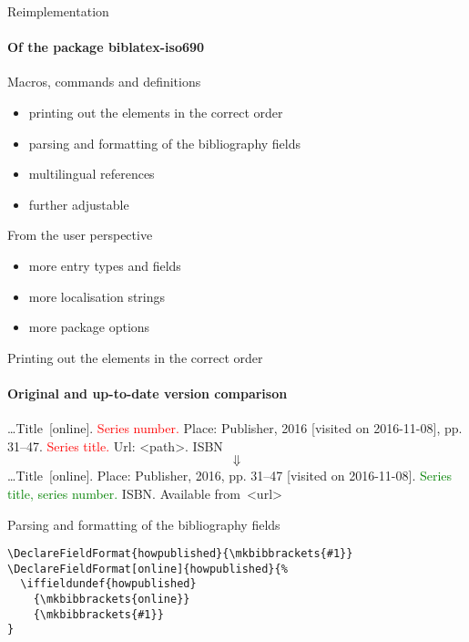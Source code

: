 \documentclass{beamer}
\begin{document}
\begin{frame}{Reimplementation}
\framesubtitle{Of the package \textsf{biblatex-iso690}}
Macros, commands and definitions
\begin{itemize}
\item printing out the elements in the correct order
\item parsing and formatting of the bibliography fields
\item multilingual references
\item further adjustable
\end{itemize}

From the user perspective
\begin{itemize}
\item more entry types and fields
\item more localisation strings
\item more package options
\end{itemize}
\end{frame}

\begin{frame}{Printing out the elements in the correct order}
\framesubtitle{Original and up-to-date version comparison}
\dots Title~[online]. \textcolor{Red}{Series number.}
      Place: Publisher, 2016 [visited on 2016-11-08], pp. 31--47.
      \textcolor{Red}{Series title.} Url: <path>. ISBN
\[
\Downarrow
\]
\dots Title~[online]. Place: Publisher, 2016, pp. 31--47
      [visited on 2016-11-08]. \textcolor{Green}{Series title,
      series number.} ISBN. Available from~<url>
\end{frame}

\begin{frame}[fragile]{Parsing and formatting of the bibliography fields}
\begin{verbatim}
\DeclareFieldFormat{howpublished}{\mkbibbrackets{#1}}
\DeclareFieldFormat[online]{howpublished}{%
  \iffieldundef{howpublished}
    {\mkbibbrackets{online}}
    {\mkbibbrackets{#1}}
}
\end{verbatim}
\end{frame}
\end{document}
